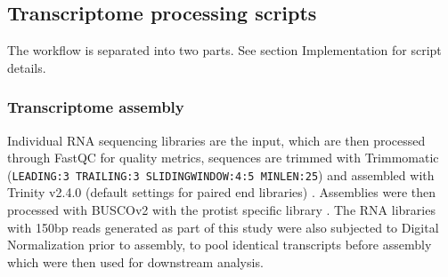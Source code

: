 \documentclass[fleqn,10pt,lineno]{wlpeerj} %
\begin{document}
\subsection*{Transcriptome processing scripts}
The workflow is separated into two parts. 
See section Implementation for script details.
\subsubsection*{Transcriptome assembly}
Individual RNA sequencing libraries are the input, which are then processed through FastQC \cite{fastqc} for quality metrics, sequences are trimmed with Trimmomatic (\texttt{LEADING:3 TRAILING:3 SLIDINGWINDOW:4:5 MINLEN:25}) \cite{bolger2014trimmomatic} and assembled with Trinity v2.4.0 (default settings for paired end libraries) \cite{haas2013novo}. 
Assemblies were then processed with BUSCOv2 with the protist specific library \cite{simao2015busco}.
The RNA libraries with 150bp reads generated as part of this study were also subjected to Digital Normalization \cite{diginorm} prior to assembly, to pool identical transcripts before assembly which were then used for downstream analysis.                                                                                                                                                                                                                                                                                                                                                                                                                                                                                                                                                                                                                                                                                                                                                                                                                                                                                                                                                                                                                                                                                                                                                                                                                                                                                                                                        
\end{document}
